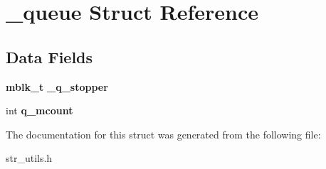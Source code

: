 \section{\+\_\+queue Struct Reference}
\label{struct__queue}
\subsection*{Data Fields}
\begin{DoxyCompactItemize}
\item 
\mbox{\label{struct__queue_a9fb89ae7828affcca8d5e794c04e1c49}} 
\textbf{ mblk\+\_\+t} {\bfseries \+\_\+q\+\_\+stopper}
\item 
\mbox{\label{struct__queue_adbe80aa5cb7134af2087aed77bcd93dd}} 
int {\bfseries q\+\_\+mcount}
\end{DoxyCompactItemize}


The documentation for this struct was generated from the following file\+:\begin{DoxyCompactItemize}
\item 
str\+\_\+utils.\+h\end{DoxyCompactItemize}
